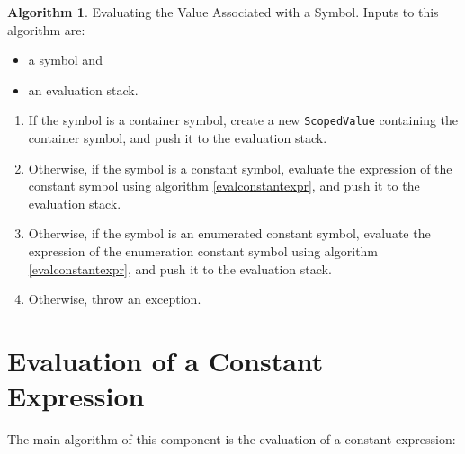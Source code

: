 \documentclass[a4paper,oneside,11pt]{book}
\theoremstyle{definition}
\newtheorem{algo}{Algorithm}[section]
\begin{document}
\begin{algo}\label{evalconstantsymbol} Evaluating the Value Associated with a Symbol.
Inputs to this algorithm are:
\begin{itemize}
\item
a symbol and
\item
an evaluation stack.
\end{itemize}
\begin{enumerate}
\item
If the symbol is a container symbol, create a new \verb|ScopedValue| containing the container symbol, and push it to the evaluation stack.
\item
Otherwise, if the symbol is a constant symbol, evaluate the expression of the constant symbol using algorithm \ref{evalconstantexpr},
and push it to the evaluation stack.
\item
Otherwise, if the symbol is an enumerated constant symbol, evaluate the expression of the enumeration constant symbol using algorithm \ref{evalconstantexpr},
and push it to the evaluation stack.
\item
Otherwise, throw an exception.
\end{enumerate}
\end{algo}

\section{Evaluation of a Constant Expression}

The main algorithm of this component is the evaluation of a constant expression:
\end{document}
